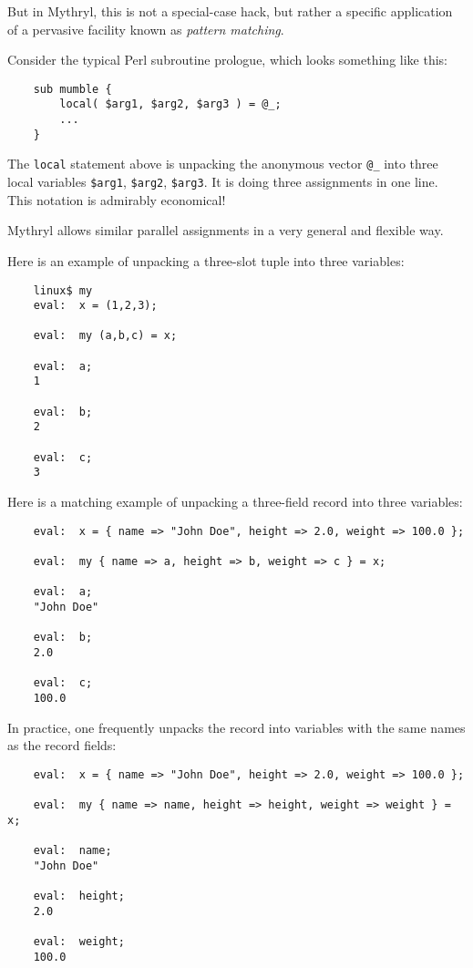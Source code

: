 But in Mythryl, this is not a special-case hack, but rather a specific application 
of a pervasive facility known as {\it pattern matching}.

Consider the typical Perl subroutine prologue, which looks something like this: 

\begin{verbatim}
    sub mumble {
        local( $arg1, $arg2, $arg3 ) = @_;
        ...
    }
\end{verbatim}

The {\tt local} statement above is unpacking the anonymous vector {\tt \verb|@_|} into 
three local variables {\tt \$arg1}, {\tt \$arg2}, {\tt \$arg3}.  It is doing 
three assignments in one line.  This notation is admirably economical!

Mythryl allows similar parallel assignments in a very general and flexible way.

Here is an example of unpacking a three-slot tuple into three variables:

\begin{verbatim}
    linux$ my
    eval:  x = (1,2,3);

    eval:  my (a,b,c) = x;

    eval:  a;
    1

    eval:  b;
    2

    eval:  c;
    3
\end{verbatim}

Here is a matching example of unpacking a three-field record into three variables:

\begin{verbatim}
    eval:  x = { name => "John Doe", height => 2.0, weight => 100.0 };

    eval:  my { name => a, height => b, weight => c } = x;

    eval:  a;
    "John Doe"

    eval:  b;
    2.0

    eval:  c;
    100.0
\end{verbatim}

In practice, one frequently unpacks the record into variables with the 
same names as the record fields:

\begin{verbatim}
    eval:  x = { name => "John Doe", height => 2.0, weight => 100.0 };

    eval:  my { name => name, height => height, weight => weight } = x;

    eval:  name;
    "John Doe"

    eval:  height;
    2.0

    eval:  weight;
    100.0
\end{verbatim}

